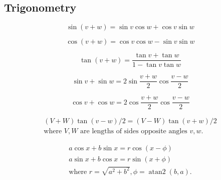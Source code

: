 \subsection{Trigonometry}

\begin{equation}
  \sin(v+w)=\sin v\cos w+\cos v\sin w
\end{equation}

\begin{equation}
  \cos(v+w)=\cos v\cos w-\sin v\sin w
\end{equation}

\begin{equation}
  \tan(v+w)=\dfrac{\tan v+\tan w}{1-\tan v\tan w}
\end{equation}

\begin{equation}
  \sin v+\sin w=2\sin\dfrac{v+w}{2}\cos\dfrac{v-w}{2}
\end{equation}

\begin{equation}
  \cos v+\cos w=2\cos\dfrac{v+w}{2}\cos\dfrac{v-w}{2}
\end{equation}

\begin{equation}
\begin{array}{c}
 (V+W)\tan(v-w)/2{}=(V-W)\tan(v+w)/2 \\
  \text{where $V, W$ are lengths of sides opposite angles $v, w$.}
\end{array}
\end{equation}


\begin{equation}
\begin{array}{c}
	a\cos x+b\sin x=r\cos(x-\phi) \\
	a\sin x+b\cos x=r\sin(x+\phi) \\
  \text{where $r=\sqrt{a^2+b^2}, \phi=\operatorname{atan2}(b,a)$.}
\end{array}
\end{equation}

 
